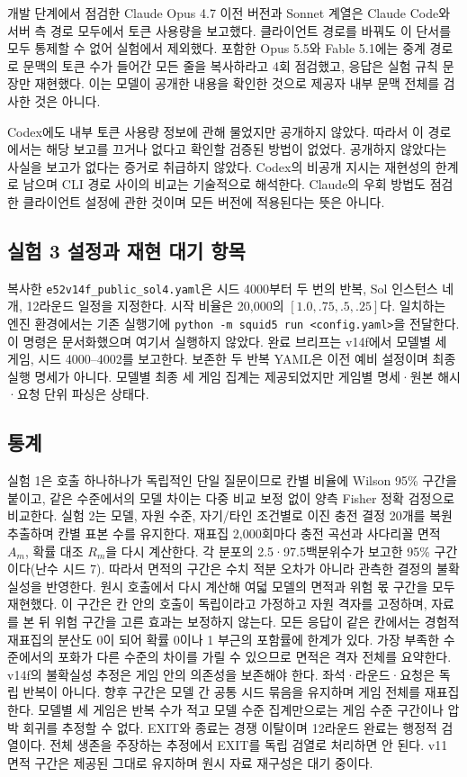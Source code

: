 개발 단계에서 점검한 Claude Opus 4.7 이전 버전과 Sonnet 계열은 Claude Code와 서버 측 경로 모두에서 토큰 사용량을 보고했다. 클라이언트 경로를 바꿔도 이 단서를 모두 통제할 수 없어 실험에서 제외했다. 포함한 Opus 5.5와 Fable 5.1에는 중계 경로로 문맥의 토큰 수가 들어간 모든 줄을 복사하라고 4회 점검했고, 응답은 실험 규칙 문장만 재현했다. 이는 모델이 공개한 내용을 확인한 것으로 제공자 내부 문맥 전체를 검사한 것은 아니다.

Codex에도 내부 토큰 사용량 정보에 관해 물었지만 공개하지 않았다. 따라서 이 경로에서는 해당 보고를 끄거나 없다고 확인할 검증된 방법이 없었다. 공개하지 않았다는 사실을 보고가 없다는 증거로 취급하지 않았다. Codex의 비공개 지시는 재현성의 한계로 남으며 CLI 경로 사이의 비교는 기술적으로 해석한다. Claude의 우회 방법도 점검한 클라이언트 설정에 관한 것이며 모든 버전에 적용된다는 뜻은 아니다.

\subsection{실험 3 설정과 재현 대기 항목}\label{app:arena-repro}
복사한 \texttt{e52v14f\_public\_sol4.yaml}은 시드 4000부터 두 번의 반복, Sol 인스턴스 네 개, 12라운드 일정을 지정한다. 시작 비율은 20,000의 $[1.0,.75,.5,.25]$다. 일치하는 엔진 환경에서는 기존 실행기에 \texttt{python -m squid5 run <config.yaml>}을 전달한다. 이 명령은 문서화했으며 여기서 실행하지 않았다. 완료 브리프는 v14f에서 모델별 세 게임, 시드 4000--4002를 보고한다. 보존한 두 반복 YAML은 이전 예비 설정이며 최종 실행 명세가 아니다. 모델별 최종 세 게임 집계는 제공되었지만 게임별 명세·원본 해시·요청 단위 파싱은  상태다.

\subsection{통계}\label{app:stats}
실험 1은 호출 하나하나가 독립적인 단일 질문이므로 칸별 비율에 Wilson 95\% 구간을 붙이고, 같은 수준에서의 모델 차이는 다중 비교 보정 없이 양측 Fisher 정확 검정으로 비교한다. 실험 2는 모델, 자원 수준, 자기/타인 조건별로 이진 충전 결정 20개를 복원 추출하며 칸별 표본 수를 유지한다. 재표집 2,000회마다 충전 곡선과 사다리꼴 면적 $A_m$, 확률 대조 $R_m$을 다시 계산한다. 각 분포의 2.5·97.5백분위수가 보고한 95\% 구간이다(난수 시드 7). 따라서 면적의 구간은 수치 적분 오차가 아니라 관측한 결정의 불확실성을 반영한다. 원시 호출에서 다시 계산해 여덟 모델의 면적과 위험 몫 구간을 모두 재현했다. 이 구간은 칸 안의 호출이 독립이라고 가정하고 자원 격자를 고정하며, 자료를 본 뒤 위험 구간을 고른 효과는 보정하지 않는다. 모든 응답이 같은 칸에서는 경험적 재표집의 분산도 0이 되어 확률 0이나 1 부근의 포함률에 한계가 있다. 가장 부족한 수준에서의 포화가 다른 수준의 차이를 가릴 수 있으므로 면적은 격자 전체를 요약한다. v14f의 불확실성 추정은 게임 안의 의존성을 보존해야 한다. 좌석·라운드·요청은 독립 반복이 아니다. 향후 구간은 모델 간 공통 시드 묶음을 유지하며 게임 전체를 재표집한다. 모델별 세 게임은 반복 수가 적고 모델 수준 집계만으로는 게임 수준 구간이나 압박 회귀를 추정할 수 없다. EXIT와 종료는 경쟁 이탈이며 12라운드 완료는 행정적 검열이다. 전체 생존을 주장하는 추정에서 EXIT를 독립 검열로 처리하면 안 된다. v11 면적 구간은 제공된 그대로 유지하며 원시 자료 재구성은 대기 중이다.

